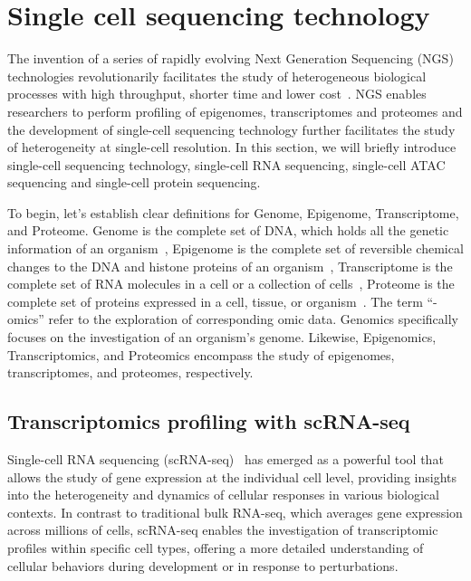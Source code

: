 \section{Single cell sequencing technology}
\label{background:profiling_singlecell}
The invention of a series of rapidly evolving Next Generation Sequencing (NGS) technologies revolutionarily facilitates the study of heterogeneous biological processes with high throughput, shorter time and lower cost~\citep{svensson2018exponential}. NGS enables researchers to perform profiling of epigenomes, transcriptomes and proteomes and the development of single-cell sequencing technology further facilitates the study of heterogeneity at single-cell resolution. In this section, we will briefly introduce single-cell sequencing technology, single-cell RNA sequencing, single-cell ATAC sequencing and single-cell protein sequencing.

To begin, let's establish clear definitions for Genome, Epigenome, Transcriptome, and Proteome. Genome is the complete set of DNA, which holds all the genetic information of an organism~\citep{hubbard2002genome}, Epigenome is the complete set of reversible chemical changes to the DNA and histone proteins of an organism~\citep{bernstein2007epigenome}, Transcriptome is the complete set of RNA molecules in a cell or a collection of cells~\citep{haoudi2006proteome}, Proteome is the complete set of proteins expressed in a cell, tissue, or organism~\citep{wang2009transcriptome}. The term “-omics” refer to the exploration of corresponding omic data. Genomics specifically focuses on the investigation of an organism's genome. Likewise, Epigenomics, Transcriptomics, and Proteomics encompass the study of epigenomes, transcriptomes, and proteomes, respectively.


\subsection{Transcriptomics profiling with scRNA-seq}
\label{background:sec1:scRNA}

Single-cell RNA sequencing (scRNA-seq)~\citep{singlecellsequencing2014, singlecellsequencing2015} has emerged as a powerful tool that allows the study of gene expression at the individual cell level, providing insights into the heterogeneity and dynamics of cellular responses in various biological contexts. In contrast to traditional bulk RNA-seq, which averages gene expression across millions of cells, scRNA-seq enables the investigation of transcriptomic profiles within specific cell types, offering a more detailed understanding of cellular behaviors during development or in response to perturbations.

